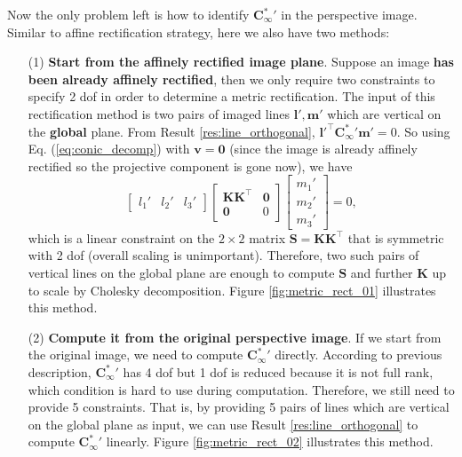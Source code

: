 \documentclass[12pt]{article}
\numberwithin{equation}{section}
\begin{document}
Now the only problem left is how to identify ${\mathbf{C}_{\infty}^{*}}'$ in the perspective image. Similar to affine rectification strategy, here we also have two methods:
\begin{enumerate}
\item [(1)]
\textbf{Start from the affinely rectified image plane}. Suppose an image \textbf{has been already affinely rectified}, then we only require two constraints to specify 2 dof in order to determine a metric rectification. The input of this rectification method is two pairs of imaged lines $\mathbf{l', m'}$ which are vertical on the \textbf{global} plane. From Result \ref{res:line_orthogonal}, $\mathbf{l'^\top}{\mathbf{C}_{\infty}^{*}}' \mathbf{m'} = 0$. So using Eq. (\ref{eq:conic_decomp}) with $\mathbf{v = 0}$ (since the image is already affinely rectified so the projective component is gone now), we have
\begin{equation*}
%
\begin{bmatrix}
l_1' & l_2' & l_3'
\end{bmatrix}
%
\begin{bmatrix}
\mathbf{KK^\top} & \mathbf{0}\\
\mathbf{0} & 0
\end{bmatrix}
%
\begin{bmatrix}
m_1'\\
m_2'\\
m_3'
\end{bmatrix}
%
= 0,
\end{equation*}
which is a linear constraint on the $2\times 2$ matrix $\mathbf{S = KK^\top}$ that is symmetric with 2 dof (overall scaling is unimportant). Therefore, two such pairs of vertical lines on the global plane are enough to compute $\mathbf{S}$ and further $\mathbf{K}$ up to scale by Cholesky decomposition. Figure \ref{fig:metric_rect_01} illustrates this method. 

\item [(2)]
\textbf{Compute it from the original perspective image}. If we start from the original image, we need to compute ${\mathbf{C}_{\infty}^{*}}'$ directly. According to previous description, ${\mathbf{C}_{\infty}^{*}}'$ has 4 dof but 1 dof is reduced because it is not full rank, which condition is hard to use during computation. Therefore, we still need to provide 5 constraints. That is, by providing 5 pairs of lines which are vertical on the global plane as input, we can use Result \ref{res:line_orthogonal} to compute ${\mathbf{C}_{\infty}^{*}}'$ linearly. Figure \ref{fig:metric_rect_02} illustrates this method. 
\end{enumerate}
\end{document}
